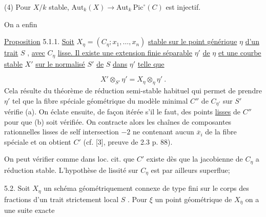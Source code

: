 (4) Pour  $X/k$  stable,  $\mathrm{Aut}_k(X) \longrightarrow \mathrm{Aut}_k\ \mathrm{Pic}^{\circ}(C)$  est injectif.

On a enfin

\underline{Proposition} 5.1.1.  \underline{Soit}  $X_\eta = (C_\eta ; x_1, \ldots, x_n)$  \underline{stable sur le point générique}  $\eta$ \underline{d'un trait}  $S$ , \underline{avec}  $C_\eta$  \underline{lisse. Il existe une extension finie séparable}  $\eta'$  \underline{de}  $\eta$ \underline{et une courbe stable}  $X'$  \underline{sur le normalisé}  $S'$  \underline{de}  $S$  \underline{dans}  $\eta'$  \underline{telle que}

\begin{equation*}
X' \otimes_{S'} \eta' = X_{\eta} \otimes_{\eta} \eta' \ .
\end{equation*}
Cela résulte du théorème de réduction semi-stable habituel qui permet de prendre  $\eta'$  tel que la fibre spéciale géométrique du modèle minimal  $C''$  de  $C_{\eta'}$ sur  $S'$  vérifie (a). On éclate ensuite, de façon itérée s'il le faut, des points \underline{lisses} de  $C''$  pour que  (b) soit vérifiée. On contracte alors les chaînes de composantes rationnelles lisses de self intersection $-2$ ne contenant aucun  $\overline{x}_i$  de la fibre spéciale et on obtient  $C'$  (cf. [3], preuve de 2.3 p. 88).

On peut vérifier comme dans loc. cit. que  $C'$  existe dès que la jacobienne de  $C_\eta$  a réduction stable. L'hypothèse de lissité sur  $C_\eta$  est par ailleurs superflue;

5.2.  Soit  $X_\eta$  un schéma géométriquement connexe de type fini sur le corps des fractions d'un trait strictement local  $S$ . Pour  $\xi$  un point géométrique de  $X_{\overline{\eta}}$  on a une suite exacte

